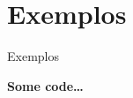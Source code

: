 \section{Exemplos}

\begin{frame}{Exemplos}
	\begin{block}{ }
		\textbf{Some code\ldots}
	\end{block}
\end{frame}